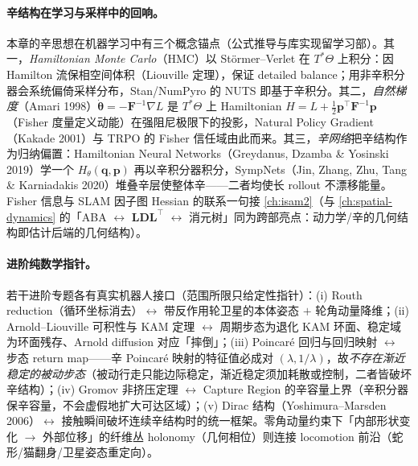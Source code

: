 \paragraph{辛结构在学习与采样中的回响。}
本章的辛思想在机器学习中有三个概念锚点（公式推导与库实现留学习部）。其一，\emph{Hamiltonian Monte Carlo}（HMC）以 Störmer--Verlet 在 $T^*\Theta$ 上积分：因 Hamilton 流保相空间体积（Liouville 定理），保证 detailed balance；用非辛积分器会系统偏倚采样分布，Stan/NumPyro 的 NUTS 即基于辛积分。其二，\emph{自然梯度}（Amari 1998\cite{amari1998natural}）$\dot{\boldsymbol\theta}=-\mathbf F^{-1}\nabla L$ 是 $T^*\Theta$ 上 Hamiltonian $H=L+\tfrac12\mathbf p^\top\mathbf F^{-1}\mathbf p$（Fisher 度量定义动能）在强阻尼极限下的投影，Natural Policy Gradient（Kakade 2001\cite{kakade2001natural}）与 TRPO 的 Fisher 信任域由此而来。其三，\emph{辛网络}把辛结构作为归纳偏置：Hamiltonian Neural Networks（Greydanus, Dzamba \& Yosinski 2019\cite{greydanus2019hamiltonian}）学一个 $H_\theta(\mathbf q,\mathbf p)$ 再以辛积分器积分，SympNets（Jin, Zhang, Zhu, Tang \& Karniadakis 2020\cite{jin2020sympnets}）堆叠辛层使整体辛——二者均使长 rollout 不漂移能量。Fisher 信息与 SLAM 因子图 Hessian 的联系一句接 \cref{ch:isam2}（与 \cref{ch:spatial-dynamics} 的「ABA $\leftrightarrow$ $\mathbf L\mathbf D\mathbf L^\top$ $\leftrightarrow$ 消元树」同为跨部亮点：动力学/辛的几何结构即估计后端的几何结构）。

\paragraph{进阶纯数学指针。}
若干进阶专题各有真实机器人接口（范围所限只给定性指针）：(i) Routh reduction（循环坐标消去）$\leftrightarrow$ 带反作用轮卫星的本体姿态 $+$ 轮角动量降维；(ii) Arnold--Liouville 可积性与 KAM 定理 $\leftrightarrow$ 周期步态为退化 KAM 环面、稳定域为环面残存、Arnold diffusion 对应「摔倒」；(iii) Poincaré 回归与回归映射 $\leftrightarrow$ 步态 return map——辛 Poincaré 映射的特征值必成对 $(\lambda,1/\lambda)$，故\emph{不存在渐近稳定的被动步态}（被动行走只能边际稳定，渐近稳定须加耗散或控制，二者皆破坏辛结构）；(iv) Gromov 非挤压定理 $\leftrightarrow$ Capture Region 的辛容量上界（辛积分器保辛容量，不会虚假地扩大可达区域）；(v) Dirac 结构（Yoshimura--Marsden 2006）$\leftrightarrow$ 接触瞬间破坏连续辛结构时的统一框架。零角动量约束下「内部形状变化 $\to$ 外部位移」的纤维丛 holonomy（几何相位）则连接 locomotion 前沿（蛇形/猫翻身/卫星姿态重定向）。

